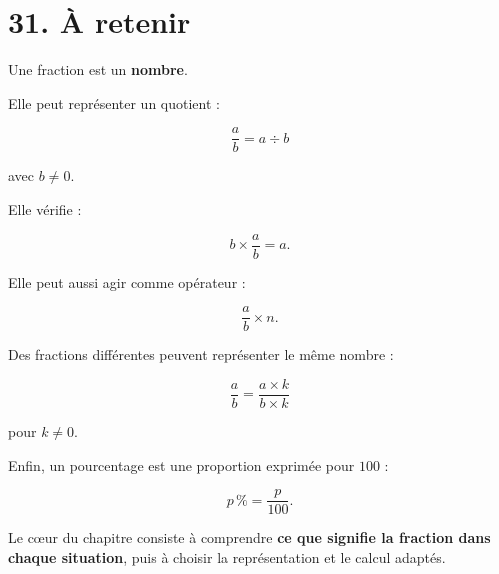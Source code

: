 \section{31. À retenir}

Une fraction est un \textbf{nombre}.

Elle peut représenter un quotient :

\[
\boxed{
\dfrac{a}{b}=a\div b
}
\]

avec $b\neq0$.

Elle vérifie :

\[
\boxed{
b\times\dfrac{a}{b}=a
}.
\]

Elle peut aussi agir comme opérateur :

\[
\boxed{
\dfrac{a}{b}\times n
}.
\]

Des fractions différentes peuvent représenter le même nombre :

\[
\boxed{
\dfrac{a}{b}
=
\dfrac{a\times k}{b\times k}
}
\]

pour $k\neq0$.

Enfin, un pourcentage est une proportion exprimée pour $100$ :

\[
\boxed{
p\,\%=\dfrac{p}{100}
}.
\]

Le cœur du chapitre consiste à comprendre \textbf{ce que signifie la fraction dans chaque situation}, puis à choisir la représentation et le calcul adaptés.
